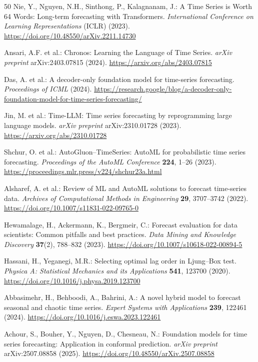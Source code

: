 \documentclass[sn-mathphys-num,pdflatex]{sn-jnl}
\begin{document}
\begin{thebibliography}{50}
Nie, Y., Nguyen, N.H., Sinthong, P., Kalagnanam, J.:
A Time Series is Worth 64 Words: Long-term forecasting with Transformers.
\textit{International Conference on Learning Representations} (ICLR) (2023).
\url{https://doi.org/10.48550/arXiv.2211.14730}

Ansari, A.F. et al.:
Chronos: Learning the Language of Time Series.
\textit{arXiv preprint} arXiv:2403.07815 (2024).
\url{https://arxiv.org/abs/2403.07815}

Das, A. et al.:
A decoder-only foundation model for time-series forecasting.
\textit{Proceedings of ICML} (2024).
\url{https://research.google/blog/a-decoder-only-foundation-model-for-time-series-forecasting/}

Jin, M. et al.:
Time-LLM: Time series forecasting by reprogramming large language models.
\textit{arXiv preprint} arXiv:2310.01728 (2023).
\url{https://arxiv.org/abs/2310.01728}

Shchur, O. et al.:
AutoGluon–TimeSeries: AutoML for probabilistic time series forecasting.
\textit{Proceedings of the AutoML Conference} \textbf{224}, 1--26 (2023).
\url{https://proceedings.mlr.press/v224/shchur23a.html}

Alsharef, A. et al.:
Review of ML and AutoML solutions to forecast time-series data.
\textit{Archives of Computational Methods in Engineering} \textbf{29}, 3707--3742 (2022).
\url{https://doi.org/10.1007/s11831-022-09765-0}

Hewamalage, H., Ackermann, K., Bergmeir, C.:
Forecast evaluation for data scientists: Common pitfalls and best practices.
\textit{Data Mining and Knowledge Discovery} \textbf{37}(2), 788--832 (2023).
\url{https://doi.org/10.1007/s10618-022-00894-5}

Hassani, H., Yeganegi, M.R.:
Selecting optimal lag order in Ljung–Box test.
\textit{Physica A: Statistical Mechanics and its Applications} \textbf{541}, 123700 (2020).
\url{https://doi.org/10.1016/j.physa.2019.123700}

Abbasimehr, H., Behboodi, A., Bahrini, A.:
A novel hybrid model to forecast seasonal and chaotic time series.
\textit{Expert Systems with Applications} \textbf{239}, 122461 (2024).
\url{https://doi.org/10.1016/j.eswa.2023.122461}

Achour, S., Bouher, Y., Nguyen, D., Chesneau, N.:
Foundation models for time series forecasting: Application in conformal prediction.
\textit{arXiv preprint} arXiv:2507.08858 (2025).
\url{https://doi.org/10.48550/arXiv.2507.08858}


\end{thebibliography}
\end{document}
